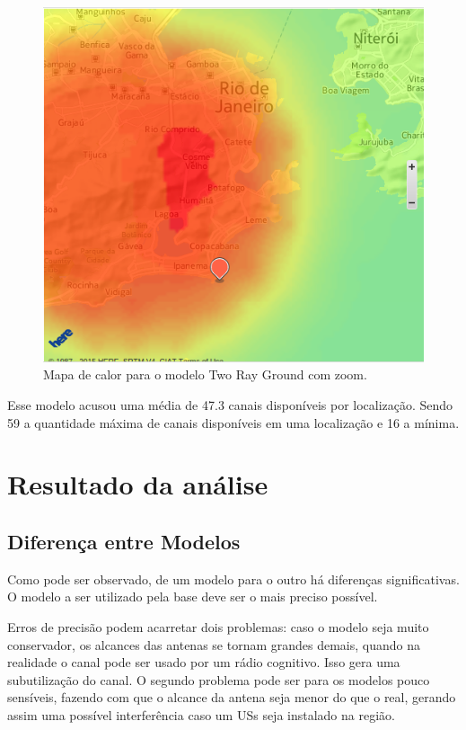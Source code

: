 \begin{figure}[htb]
\centering
\includegraphics[width=1.0\textwidth]{figs/longleyricein}
\caption[Mapa de calor para o modelo Two Ray Ground com zoom.]
{Mapa de calor para o modelo Two Ray Ground com zoom.}
\label{fig:longleyricein}
\end{figure} 

\FloatBarrier

Esse modelo acusou uma média de 47.3 canais disponíveis por localização. Sendo 59 a quantidade máxima de canais disponíveis em uma localização e 16 a mínima.

\section{Resultado da análise}

\subsection{Diferença entre Modelos}

Como pode ser observado, de um modelo para o outro há diferenças significativas. O modelo a ser utilizado pela base deve ser o mais preciso possível.

Erros de precisão podem acarretar dois problemas: caso o modelo seja muito conservador, os alcances das antenas se tornam grandes demais, quando na realidade o canal pode ser usado por um rádio cognitivo. Isso gera uma subutilização do canal. O segundo problema pode ser para os modelos pouco sensíveis, fazendo com que o alcance da antena seja menor do que o real, gerando assim uma possível interferência caso um USs seja instalado na região.

